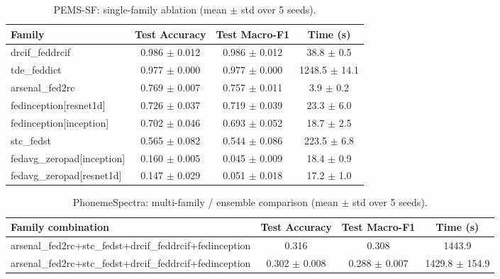 \begin{table}[t]
\centering
\caption{PEMS-SF: single-family ablation (mean $\pm$ std over 5 seeds).}
\label{tab:results_pems-sf_ablation}
\begin{tabular}{lccc}
\toprule
Family & Test Accuracy & Test Macro-F1 & Time (s) \\
\midrule
drcif\_feddrcif & 0.986 $\pm$ 0.012 & 0.986 $\pm$ 0.012 & 38.8 $\pm$ 0.5 \\
tde\_feddict & 0.977 $\pm$ 0.000 & 0.977 $\pm$ 0.000 & 1248.5 $\pm$ 14.1 \\
arsenal\_fed2rc & 0.769 $\pm$ 0.007 & 0.757 $\pm$ 0.011 & 3.9 $\pm$ 0.2 \\
fedinception[resnet1d] & 0.726 $\pm$ 0.037 & 0.719 $\pm$ 0.039 & 23.3 $\pm$ 6.0 \\
fedinception[inception] & 0.702 $\pm$ 0.046 & 0.693 $\pm$ 0.052 & 18.7 $\pm$ 2.5 \\
stc\_fedst & 0.565 $\pm$ 0.082 & 0.544 $\pm$ 0.086 & 223.5 $\pm$ 6.8 \\
fedavg\_zeropad[inception] & 0.160 $\pm$ 0.005 & 0.045 $\pm$ 0.009 & 18.4 $\pm$ 0.9 \\
fedavg\_zeropad[resnet1d] & 0.147 $\pm$ 0.029 & 0.051 $\pm$ 0.018 & 17.2 $\pm$ 1.0 \\
\bottomrule
\end{tabular}
\end{table}

\begin{table}[t]
\centering
\caption{PhonemeSpectra: multi-family / ensemble comparison (mean $\pm$ std over 5 seeds).}
\label{tab:results_phonemespectra_ensemble}
\begin{tabular}{lccc}
\toprule
Family combination & Test Accuracy & Test Macro-F1 & Time (s) \\
\midrule
arsenal\_fed2rc+stc\_fedst+drcif\_feddrcif+fedinception & 0.316 & 0.308 & 1443.9 \\
arsenal\_fed2rc+stc\_fedst+drcif\_feddrcif+fedinception & 0.302 $\pm$ 0.008 & 0.288 $\pm$ 0.007 & 1429.8 $\pm$ 154.9 \\
\bottomrule
\end{tabular}
\end{table}

